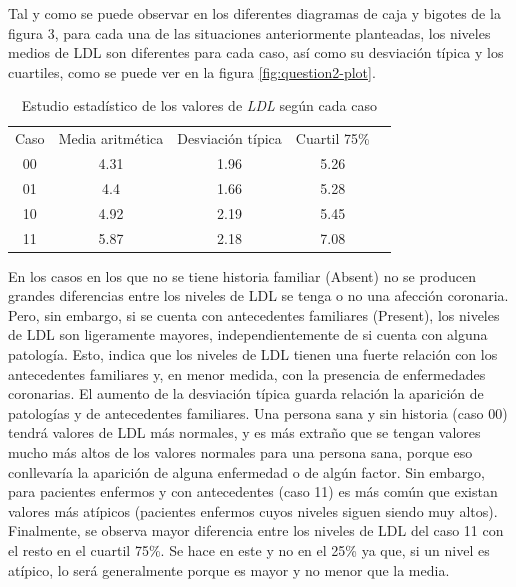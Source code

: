 \documentclass[a4paper, 9pt]{article}
\begin{document}
\vspace{3mm}

Tal y como se puede observar en los diferentes diagramas de caja y bigotes de la figura 3, para cada una de las situaciones anteriormente planteadas, los niveles medios de LDL son diferentes para cada caso, así como su desviación típica y los cuartiles, como se puede ver en la figura \ref{fig:question2-plot}. 

\begin{table}[H]
\centering
\begin{tabular}{c|c|c|cl}
Caso & Media aritmética & Desviación típica & Cuartil 75\% &  \\ \cline{1-4}
00   & 4.31             & 1.96              & 5.26         &  \\
01   & 4.4              & 1.66              & 5.28         &  \\
10   & 4.92             & 2.19              & 5.45         &  \\
11   & 5.87             & 2.18              & 7.08         & 
\end{tabular}
\caption{Estudio estadístico de los valores de \textit{LDL} según cada caso}
\end{table}

En los casos en los que no se tiene historia familiar (Absent) no se producen grandes diferencias entre los niveles de LDL se tenga o no una afección coronaria. Pero, sin embargo, si se cuenta con antecedentes familiares (Present), los niveles de LDL son ligeramente mayores, independientemente de si cuenta con alguna patología. Esto, indica que los niveles de LDL tienen una fuerte relación con los antecedentes familiares y, en menor medida, con la presencia de enfermedades coronarias.
El aumento de la desviación típica guarda relación la aparición de patologías y de antecedentes familiares. Una persona sana y sin historia (caso 00) tendrá valores de LDL más normales, y es más extraño que se tengan valores mucho más altos de los valores normales para una persona sana, porque eso conllevaría la aparición de alguna enfermedad o de algún factor. Sin embargo, para pacientes enfermos y con antecedentes (caso 11) es más común que existan valores más atípicos (pacientes enfermos cuyos niveles siguen siendo muy altos). Finalmente, se observa mayor diferencia entre los niveles de LDL del caso 11 con el resto en el cuartil 75\%. Se hace en este y no en el 25\% ya que, si un nivel es atípico, lo será generalmente porque es mayor y no menor que la media.
\end{document}
